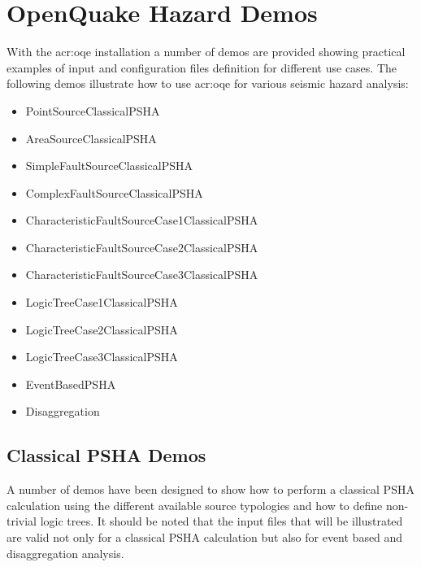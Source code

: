\section{OpenQuake Hazard Demos}
With the \gls{acr:oqe} installation a number of demos are provided showing practical examples
of input and configuration files definition for different use cases.
The following demos illustrate how to use \gls{acr:oqe} for various seismic hazard analysis:
\begin{itemize}
\item PointSourceClassicalPSHA
\item AreaSourceClassicalPSHA
\item SimpleFaultSourceClassicalPSHA
\item ComplexFaultSourceClassicalPSHA
\item CharacteristicFaultSourceCase1ClassicalPSHA
\item CharacteristicFaultSourceCase2ClassicalPSHA
\item CharacteristicFaultSourceCase3ClassicalPSHA
\item LogicTreeCase1ClassicalPSHA
\item LogicTreeCase2ClassicalPSHA
\item LogicTreeCase3ClassicalPSHA
\item EventBasedPSHA
\item Disaggregation
\end{itemize}

\subsection{Classical PSHA Demos}
A number of demos have been designed to show how to perform a classical PSHA calculation using the different available
source typologies and how to define non-trivial logic trees. It should be noted that the input files that will be illustrated are valid
not only for a classical PSHA calculation but also for event based and disaggregation analysis.\\

